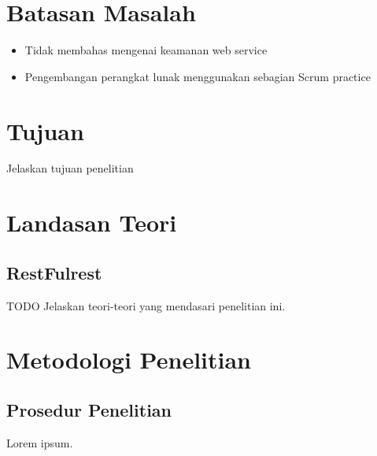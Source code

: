 \documentclass[a4paper, 12pt]{report}
\begin{document}
\section*{Batasan Masalah}
\begin{flushleft}
\begin{itemize}
  \item Tidak membahas mengenai keamanan web service
  \item Pengembangan perangkat lunak menggunakan sebagian Scrum practice
\end{itemize}
\end{flushleft}

\section*{Tujuan}
\begin{flushleft}
Jelaskan tujuan penelitian
\end{flushleft}

\section*{Landasan Teori}
\subsection*{RestFulrest}
\begin{flushleft}
TODO Jelaskan teori-teori yang mendasari penelitian ini.
\end{flushleft}

\section*{Metodologi Penelitian}

\subsection*{Prosedur Penelitian}
\begin{flushleft}
Lorem ipsum.
\end{flushleft}
\end{document}
